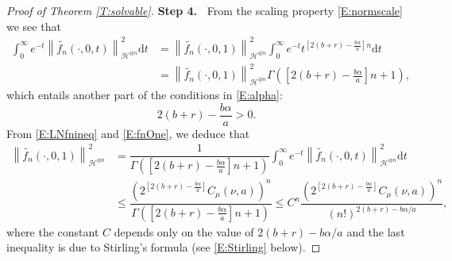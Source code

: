 \documentclass[a4paper,11pt]{article}
\numberwithin{equation}{section}
\numberwithin{equation}{section}
\theoremstyle{plain}
\theoremstyle{definition}
\newcommand{\ud}{\ensuremath{\mathrm{d} }}
\newcommand{\Norm}[1]{\left\|  #1   \right\|}
\begin{document}
\begin{proof}[Proof of Theorem \ref{T:solvable}]
  {\bigskip\bf\noindent Step 4.~}%
  From the scaling property \eqref{E:normscale} we see that
  \begin{align}
    \nonumber
    \int_0^\infty e^{-t} \Norm{ \widetilde{f_n}\left(\cdot,0,t\right) }_{ \mathcal{H}^{\otimes n} }^2 \ud t
    & = \Norm{ \widetilde{f_n}(\cdot,0,1) }_{ \mathcal{H}^{\otimes n} }^2 \int_0^\infty e^{-t} t^{ \left[ 2(b+r)-\frac{b \alpha}{a} \right] n } \ud t \\
    & = \Norm{ \widetilde{f_n}(\cdot,0,1) }_{ \mathcal{H}^{\otimes n} }^2 \Gamma\left( \left[ 2(b+r)- \frac{b \alpha}{a} \right] n +1 \right),
    \label{E:fnOne}
  \end{align}
  which entails another part of the conditions in \eqref{E:alpha}:
  \begin{equation} \label{E:alpha3}
    2(b+r)-\frac{b\alpha}{a} >0.
  \end{equation}
  From \eqref{E:LNfnineq} and \eqref{E:fnOne}, we deduce that
  \begin{align*}
    \Norm{ \widetilde{f_n}(\cdot,0,1) }_{ \mathcal{H}^{\otimes n} }^2
    & = \dfrac{1}{ \Gamma\left( \left[ 2(b+r)- \frac{b \alpha}{a} \right] n +1 \right) }  \int_0^\infty e^{-t} \Norm{ \widetilde{f_n}(\cdot,0,t) }_{ \mathcal{H}^{\otimes n} }^2 \ud t \\
    & \le \dfrac{ \left(2^{ \left[ 2(b+r)- \frac{b \alpha}{a} \right]}C_\mu(\nu, a) \right)^n }{\Gamma\left( \left[ 2(b+r)- \frac{b \alpha}{a} \right] n +1 \right) }
    \le C^n \dfrac{ \left(2^{ \left[ 2(b+r)- \frac{b \alpha}{a} \right]}C_\mu(\nu,a) \right)^n }{ (n!)^{ 2(b+r) - b\alpha/a }},
  \end{align*}
  where the constant $C$ depends only on the value of $2(b+r)-b\alpha/a$ and the last inequality is
  due to Stirling's formula (see \eqref{E:Stirling} below).


\end{proof}
\end{document}
